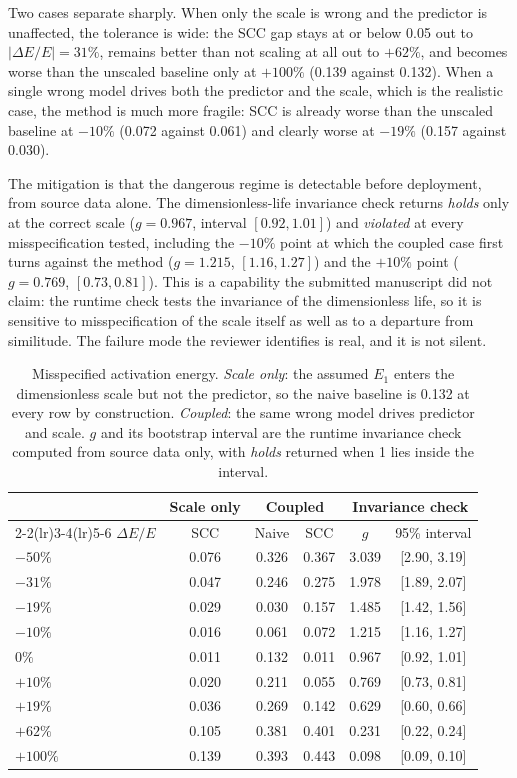 Two cases separate sharply. When only the scale is wrong and the predictor is unaffected, the
tolerance is wide: the SCC gap stays at or below 0.05 out to $\lvert\Delta E/E\rvert=31\%$, remains
better than not scaling at all out to $+62\%$, and becomes worse than the unscaled baseline only at
$+100\%$ (0.139 against 0.132). When a single wrong model drives both the predictor and the scale,
which is the realistic case, the method is much more fragile: SCC is already worse than the unscaled
baseline at $-10\%$ (0.072 against 0.061) and clearly worse at $-19\%$ (0.157 against 0.030).

The mitigation is that the dangerous regime is detectable before deployment, from source data alone.
The dimensionless-life invariance check returns \emph{holds} only at the correct scale ($g=0.967$,
interval $[0.92,1.01]$) and \emph{violated} at every misspecification tested, including the $-10\%$
point at which the coupled case first turns against the method ($g=1.215$, $[1.16,1.27]$) and the
$+10\%$ point ($g=0.769$, $[0.73,0.81]$). This is a capability the submitted manuscript did not
claim: the runtime check tests the invariance of the dimensionless life, so it is sensitive to
misspecification of the scale itself as well as to a departure from similitude. The failure mode the
reviewer identifies is real, and it is not silent.

\begin{table}[t]\centering\footnotesize
\setlength{\tabcolsep}{7pt}\renewcommand{\arraystretch}{1.2}
\caption{Misspecified activation energy. \emph{Scale only}: the assumed $E_1$ enters the
dimensionless scale but not the predictor, so the naive baseline is 0.132 at every row by
construction. \emph{Coupled}: the same wrong model drives predictor and scale. $g$ and its bootstrap
interval are the runtime invariance check computed from source data only, with \emph{holds} returned
when 1 lies inside the interval.}\label{tab:misspec}
\begin{tabular}{@{}lccccc@{}}\toprule
& Scale only & \multicolumn{2}{c}{Coupled} & \multicolumn{2}{c}{Invariance check} \\
\cmidrule(lr){2-2}\cmidrule(lr){3-4}\cmidrule(lr){5-6}
$\Delta E/E$ & SCC & Naive & SCC & $g$ & 95\% interval \\\midrule
$-50\%$  & 0.076 & 0.326 & 0.367 & 3.039 & [2.90, 3.19] \\
$-31\%$  & 0.047 & 0.246 & 0.275 & 1.978 & [1.89, 2.07] \\
$-19\%$  & 0.029 & 0.030 & 0.157 & 1.485 & [1.42, 1.56] \\
$-10\%$  & 0.016 & 0.061 & 0.072 & 1.215 & [1.16, 1.27] \\
$0\%$    & 0.011 & 0.132 & 0.011 & 0.967 & [0.92, 1.01] \\
$+10\%$  & 0.020 & 0.211 & 0.055 & 0.769 & [0.73, 0.81] \\
$+19\%$  & 0.036 & 0.269 & 0.142 & 0.629 & [0.60, 0.66] \\
$+62\%$  & 0.105 & 0.381 & 0.401 & 0.231 & [0.22, 0.24] \\
$+100\%$ & 0.139 & 0.393 & 0.443 & 0.098 & [0.09, 0.10] \\\bottomrule
\end{tabular}
\end{table}

